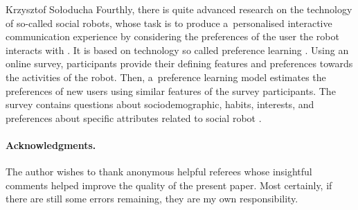 \begin{artengenv}{Krzysztof Sołoducha}
Fourthly, there is quite advanced research on the technology of so-called social robots, whose task is to produce a~personalised interactive communication experience by considering the preferences of the user the robot interacts with
\parencite[][]{maroto-gomez_adaptive_2022}. %
 It is based on technology so called preference learning 
\parencite[][]{furnkranz_preference_2011}. %
 Using an online survey, participants provide their defining features and preferences towards the activities of the robot. Then, a~preference learning model estimates the preferences of new users using similar features of the survey participants. The survey contains questions about sociodemographic, habits, interests, and preferences about specific attributes related to social robot 
\parencite[][p.2]{furnkranz_preference_2011}.%


\paragraph{Acknowledgments.}
The author wishes to thank anonymous helpful referees whose insightful comments helped improve the quality of the present paper. Most certainly, if there are still some errors remaining, they are my own responsibility.
\enlargethispage{2\baselineskip}



\end{artengenv}

